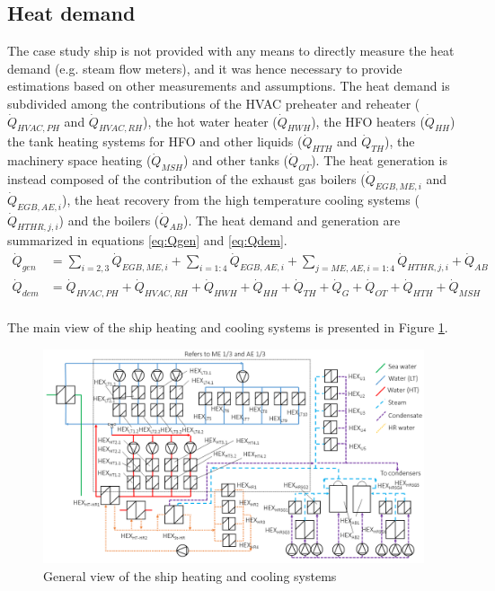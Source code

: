 \documentclass[preprint,12pt]{elsarticle}
\begin{document}
\subsection{Heat demand} \label{sec:met:heat}

The case study ship is not provided with any means to directly measure the heat demand (e.g. steam flow meters), and it was hence necessary to provide estimations based on other measurements and assumptions. The heat demand is subdivided among the contributions of the HVAC preheater and reheater ($\dot{Q}_{HVAC,PH}$ and $\dot{Q}_{HVAC,RH}$), the hot water heater ($\dot{Q}_{HWH}$), the HFO heaters ($\dot{Q}_{HH}$) the tank heating systems for HFO and other liquids ($\dot{Q}_{HTH}$ and $\dot{Q}_{TH}$), the machinery space heating ($\dot{Q}_{MSH}$) and other tanks ($\dot{Q}_{OT}$). The heat generation is instead composed of the contribution of the exhaust gas boilers ($\dot{Q}_{EGB,ME,i}$ and $\dot{Q}_{EGB,AE,i}$), the heat recovery from the high temperature cooling systems ($\dot{Q}_{HTHR,j,i}$) and the boilers ($\dot{Q}_{AB}$).
 The heat demand and generation are summarized in equations \ref{eq:Qgen} and \ref{eq:Qdem}.
\begin{align}
\dot{Q}_{gen} & = \sum_{i=2,3} \dot{Q}_{EGB,ME,i} +  \sum_{i=1:4} \dot{Q}_{EGB,AE,i} + \sum_{j=ME,AE, i=1:4}\dot{Q}_{HTHR,j,i} + \dot{Q}_{AB} \label{eq:Qgen} \\
\dot{Q}_{dem} & = \dot{Q}_{HVAC,PH} + \dot{Q}_{HVAC,RH} + \dot{Q}_{HWH} + \dot{Q}_{HH} + \dot{Q}_{TH} + \dot{Q}_{G} + \dot{Q}_{OT} + 	\dot{Q}_{HTH} + \dot{Q}_{MSH} \label{eq:Qdem} \\
\end{align}

The main view of the ship heating and cooling systems is presented in Figure \ref{fig:ship:general}.

\begin{figure}
	\centering
	\includegraphics[width=0.999\linewidth]{Figures/Heating_cooling_systems}
	\caption{General view of the ship heating and cooling systems}
	\label{fig:ship:general}
\end{figure}
\end{document}
